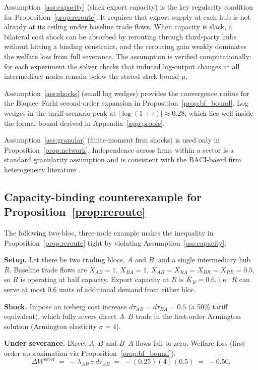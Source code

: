 \documentclass[12pt]{article}
\begin{document}
Assumption~\ref{ass:capacity} (slack export capacity) is the key regularity condition for Proposition~\ref{prop:reroute}. It requires that export supply at each hub is not already at its ceiling under baseline trade flows. When capacity is slack, a bilateral cost shock can be absorbed by rerouting through third-party hubs without hitting a binding constraint, and the rerouting gain weakly dominates the welfare loss from full severance. The assumption is verified computationally: for each experiment the solver checks that induced log-output changes at all intermediary nodes remain below the stated slack bound $\mu$.

Assumption~\ref{ass:shocks} (small log wedges) provides the convergence radius for the Baqaee--Farhi second-order expansion in Proposition~\ref{prop:bf_bound}. Log wedges in the tariff scenario peak at $|\log(1+\tau)|\approx 0.28$, which lies well inside the formal bound derived in Appendix~\ref{app:proofs}.

Assumption~\ref{ass:granular} (finite-moment firm shocks) is used only in Proposition~\ref{prop:network}. Independence across firms within a sector is a standard granularity assumption and is consistent with the BACI-based firm heterogeneity literature \citep{Gabaix2011,diGiovanniLevchenkoMejean2014}.

\subsection*{Capacity-binding counterexample for Proposition~\ref{prop:reroute}}

The following two-bloc, three-node example makes the inequality in Proposition~\ref{prop:reroute} tight by violating Assumption~\ref{ass:capacity}.

\textbf{Setup.} Let there be two trading blocs, $A$ and $B$, and a single intermediary hub $R$. Baseline trade flows are $X_{AB}=1$, $X_{BA}=1$, $X_{AR}=X_{RA}=X_{BR}=X_{RB}=0.5$, so $R$ is operating at half capacity. Export capacity at $R$ is $\bar{K}_R = 0.6$, i.e.\ $R$ can serve at most 0.6 units of additional demand from either bloc.

\textbf{Shock.} Impose an iceberg cost increase $d\tau_{AB}=d\tau_{BA}=0.5$ (a 50\% tariff equivalent), which fully severs direct $A$--$B$ trade in the first-order Armington solution (Armington elasticity $\sigma=4$).

\textbf{Under severance.} Direct $A$--$B$ and $B$--$A$ flows fall to zero. Welfare loss (first-order approximation via Proposition~\ref{prop:bf_bound}):
\[
  \Delta W^{\text{sever}} \;=\; -\lambda_{AB}\,\sigma\,d\tau_{AB} \;=\; -(0.25)(4)(0.5) \;=\; -0.50.
\]
\end{document}
